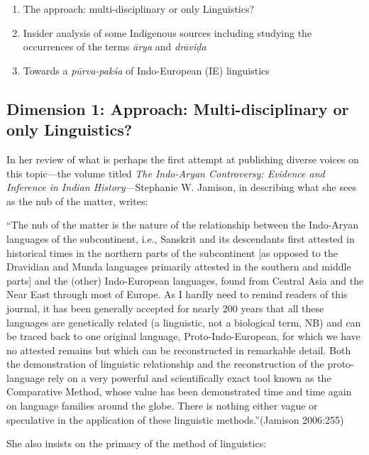 \begin{enumerate}
\item The approach: multi-disciplinary or only Linguistics?

 \item Insider analysis of some Indigenous sources including studying the occurrences of the terms \textit{ārya} and \textit{drāviḍa}

 \item Towards a \textit{pūrva-pakśa} of Indo-European (IE) linguistics

\end{enumerate}


\subsection{Dimension 1: Approach: Multi-disciplinary or only Linguistics?}

In her review of what is perhaps the first attempt at publishing diverse voices on this topic—the volume titled \textit{The Indo-Aryan Controversy: Evidence and Inference in Indian History}—Stephanie W. Jamison, in describing what she sees as the nub of the matter, writes:

\begin{myquote}
“The nub of the matter is the nature of the relationship between the Indo-Aryan languages of the subcontinent, i.e., Sanskrit and its descendants first attested in historical times in the northern parts of the subcontinent [as opposed to the Dravidian and Munda languages primarily attested in the southern and middle parts] and the (other) Indo-European languages, found from Central Asia and the Near East through most of Europe. As I hardly need to remind readers of this journal, it has been generally accepted for nearly 200 years that all these languages are genetically related (a linguistic, not a biological term, NB) and can be traced back to one original language, Proto-Indo-European, for which we have no attested remains but which can be reconstructed in remarkable detail. Both the demonstration of linguistic relationship and the reconstruction of the proto-language rely on a very powerful and scientifically exact tool known as the Comparative Method, whose value has been demonstrated time and time again on language families around the globe. There is nothing either vague or speculative in the application of these linguistic methods.”\hfill (Jamison 2006:255)
\end{myquote}

She also insists on the primacy of the method of linguistics:

